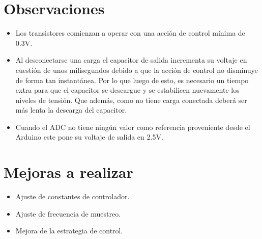 \section*{Observaciones}
\begin{itemize}
    \item Los transistores comienzan a operar con una acción de control mínima de 0.3V.
    \item Al desconectarse una carga el capacitor de salida incrementa su voltaje en cuestión de unos milisegundos debido a que la acción de control no disminuye de forma tan instantánea. Por lo que luego de esto, es necesario un tiempo extra para que el capacitor se descargue y se estabilicen nuevamente los niveles de tensión. Que además, como no tiene carga conectada deberá ser más lenta la descarga del capacitor.
    \item Cuando el ADC no tiene ningún valor como referencia proveniente desde el Arduino este pone su voltaje de salida en 2.5V.
\end{itemize}

\section*{Mejoras a realizar}
\begin{itemize}
    \item Ajuste de constantes de controlador.
    \item Ajuste de frecuencia de muestreo.
    \item Mejora de la estrategia de control.
\end{itemize}

